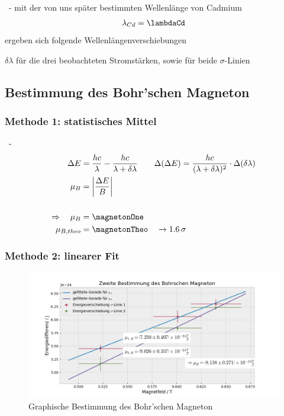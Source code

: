       \begin{myframe}{\subsecname\ - \subsubsecname}
          mit der von uns sp\"ater bestimmten Wellenl\"ange von Cadmium
          \begin{align}
              \lambda_{Cd}=\lambdaCd 
          \end{align} 
          ergeben sich folgende Wellenl\"angenverschiebungen
          \begin{table}[H]
              \centering
              
              \caption{$\delta\lambda$ für die drei beobachteten Stromstärken, sowie für beide $\sigma$-Linien}
          \end{table}
      \end{myframe}
  \subsection{Bestimmung des Bohr'schen Magneton}
  \subsubsection{Methode 1: statistisches Mittel}
      \begin{myframe}{\subsecname\ - \\\subsubsecname}
          \begin{align}
                \Delta E         &= \frac{hc}\lambda-\frac{hc}{\lambda+\delta\lambda}\qquad
                \Delta(\Delta E) = \frac{hc}{(\lambda+\delta\lambda)^2}\cdot\Delta(\delta\lambda              )\\
                \mu_B&=\left| \frac{\Delta E}{B} \right|\\\nonumber\\
                \Rightarrow \quad \mu_B &= \magnetonOne\\
                \mu_{B, theo} &= \magnetonTheo \quad \rightarrow \SI{1.6}{\sigma}
         \end{align}
      \end{myframe}      
  \subsubsection{Methode 2: linearer Fit}
        \begin{myframe}{\subsubsecname}
            \begin{figure}
                \centering
                \includegraphics[width=.85\paperwidth]{img/mu_B2}
                \caption{Graphische Bestimmung des Bohr’schen Magneton} 
            \end{figure}            
        \end{myframe}
